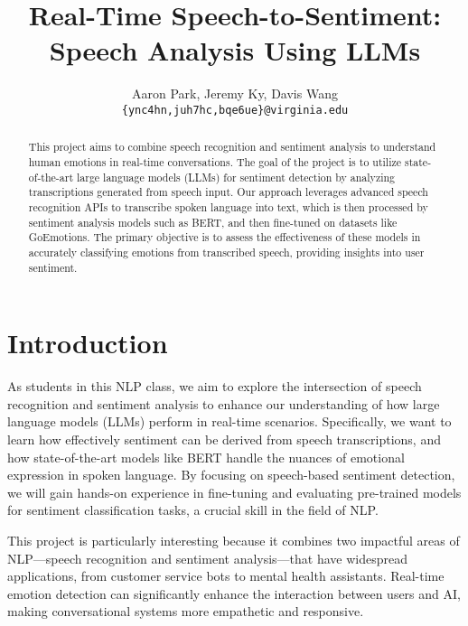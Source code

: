 \documentclass{article} %
\title{Real-Time Speech-to-Sentiment: \\
Speech Analysis Using LLMs}
\author{Aaron Park, Jeremy Ky, Davis Wang \\
\texttt{\{ync4hn,juh7hc,bqe6ue\}@virginia.edu}
}
\begin{document}
\maketitle

\begin{abstract}
This project aims to combine speech recognition and sentiment analysis to understand human emotions in real-time conversations. The goal of the project is to utilize state-of-the-art large language models (LLMs) for sentiment detection by analyzing transcriptions generated from speech input. Our approach leverages advanced speech recognition APIs to transcribe spoken language into text, which is then processed by sentiment analysis models such as BERT, and then fine-tuned on datasets like GoEmotions. The primary objective is to assess the effectiveness of these models in accurately classifying emotions from transcribed speech, providing insights into user sentiment. 

\end{abstract}

\section{Introduction}
As students in this NLP class, we aim to explore the intersection of speech recognition and sentiment analysis to enhance our understanding of how large language models (LLMs) perform in real-time scenarios. Specifically, we want to learn how effectively sentiment can be derived from speech transcriptions, and how state-of-the-art models like BERT handle the nuances of emotional expression in spoken language. By focusing on speech-based sentiment detection, we will gain hands-on experience in fine-tuning and evaluating pre-trained models for sentiment classification tasks, a crucial skill in the field of NLP.

This project is particularly interesting because it combines two impactful areas of NLP—speech recognition and sentiment analysis—that have widespread applications, from customer service bots to mental health assistants. Real-time emotion detection can significantly enhance the interaction between users and AI, making conversational systems more empathetic and responsive.
\end{document}
